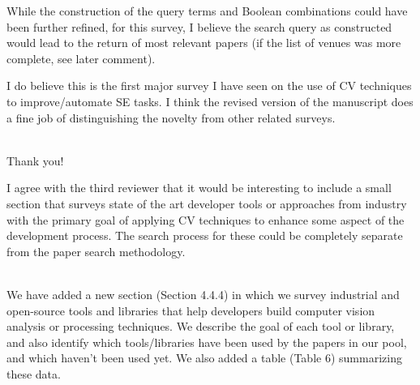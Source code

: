 \documentclass[12pt]{article}
\newcommand\response[1]{\textcolor{responseColor}{\\#1\\}}
\begin{document}
While the construction of the query terms and Boolean combinations could have been further refined, for this survey, I believe the search query as constructed would lead to the return of most relevant papers (if the list of venues was more complete, see later comment).

I do believe this is the first major survey I have seen on the use of CV techniques to improve/automate SE tasks. I think the revised version of the manuscript does a fine job of distinguishing the novelty from other related surveys. 

\response{Thank you!}


I agree with the third reviewer 
that it would be interesting to include 
a small section that surveys state of the art 
developer tools or approaches from industry 
with the primary goal of applying CV techniques 
to enhance some aspect of the development process. 
The search process for these 
could be completely separate from 
the paper search methodology.

\response{
We have added a new section (Section 4.4.4) 
in which we survey industrial and open-source 
tools and libraries that help developers 
build computer vision analysis or processing techniques. 
We describe the goal of each tool or library, 
and also identify which tools/libraries have been 
used by the papers in our pool, 
and which haven't been used yet. 
We also added a table (Table 6) 
summarizing these data.
}
\end{document}
